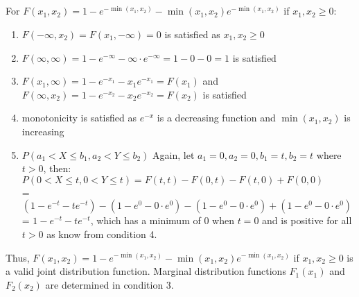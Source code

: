 \documentclass[11pt,a4paper,margin=1in]{article}
\begin{document}
    \subsection{}
        For $F(x_1, x_2) = 1 - e^{-\min(x_1, x_2)} - \min(x_1, x_2) e^{-\min(x_1, x_2)}$ if $x_1, x_2 \geq 0$:
        \begin{enumerate}[1.]
            \item $F(-\infty, x_2) = F(x_1, -\infty) = 0$ is satisfied as $x_1, x_2 \geq 0$
            \item $F(\infty, \infty) = 1 - e^{-\infty} - \infty \cdot e^{-\infty} = 1 - 0 - 0 = 1$ is satisfied
            \item $F(x_1, \infty) = 1 - e^{-x_1} - x_1 e^{-x_1} = F(x_1)$ and $F(\infty, x_2) = 1 - e^{-x_2} - x_2 e^{-x_2} = F(x_2)$ is satisfied
            \item monotonicity is satisfied as $e^{-x}$ is a decreasing function and $\min(x_1, x_2)$ is increasing
            \item $P(a_1 < X \leq b_1, a_2 < Y \leq b_2)$ Again, let $a_1 = 0, a_2 = 0, b_1 = t, b_2 = t$ where $t > 0$, then:\\
            $P(0 < X \leq t, 0 < Y \leq t) = F(t, t) - F(0, t) - F(t, 0) + F(0, 0)$\\
            = $(1 - e^{-t} - t e^{-t}) - (1 - e^{0} - 0 \cdot e^{0}) - (1 - e^{0} - 0 \cdot e^{0}) + (1 - e^{0} - 0 \cdot e^{0})$\\
            = $1 - e^{-t} - t e^{-t}$, which has a minimum of 0 when $t = 0$ and is positive for all $t > 0$ as know from condition 4.
        \end{enumerate}
        \noindent Thus, $F(x_1, x_2) = 1 - e^{-\min(x_1, x_2)} - \min(x_1, x_2) e^{-\min(x_1, x_2)}$ if $x_1, x_2 \geq 0$ is a valid joint distribution function. 
        Marginal distribution functions $F_1(x_1)$ and $F_2(x_2)$ are determined in condition 3.
\end{document}
